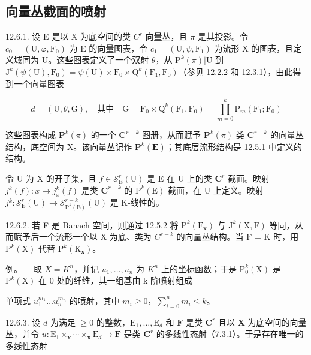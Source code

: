 \subsection{向量丛截面的喷射}

12.6.1. 设 E 是以 X 为底空间的类 \(C^{r}\) 向量丛，且 \(\pi\) 是其投影。令 \(c_{0} = (\mathrm{U}, \varphi, \mathrm{F}_{0})\) 为 E 的向量图表，令 \(c_{1} = (\mathrm{U}, \psi, \mathrm{F}_{1})\) 为流形 X 的图表，且定义域同为 U。这些图表定义了一个双射 \(\theta\)，从 \(\mathrm{P}^{k}(\pi)|\mathrm{U}\) 到 \(\mathrm{J}^{k}(\psi(\mathrm{U}), \mathrm{F}_{0}) = \psi(\mathrm{U}) \times \mathrm{F}_{0} \times \mathrm{Q}^{k}(\mathrm{F}_{1}, \mathrm{F}_{0})\)（参见 12.2.2 和 12.3.1），由此得到一个向量图表

\[
d = (\mathrm{U}, \theta, \mathrm{G}), \quad \text{其中}\quad \mathrm{G} = \mathrm{F}_{0}\times\mathrm{Q}^{k}(\mathrm{F}_{1},\mathrm{F}_{0}) = \prod_{m=0}^{k}\mathrm{P}_{m}(\mathrm{F}_{1};\mathrm{F}_{0})
\]

这些图表构成 \(\mathbf{P}^{k}(\pi)\) 的一个 \(\mathbf{C}^{r - k}\)-图册，从而赋予 \(\mathbf{P}^{k}(\pi)\) 类 \(\mathbf{C}^{r - k}\) 的向量丛结构，底空间为 X。该向量丛记作 \(\mathbf{P}^{k}(\mathbf{E})\)；其底层流形结构是 12.5.1 中定义的结构。

令 U 为 X 的开子集，且 \(f \in \mathcal{S}_{\mathrm{E}}^{r}(\mathrm{U})\) 是 E 在 U 上的类 \(\mathbf{C}^{r}\) 截面。映射 \(j^{k}(f): x \mapsto j_{x}^{k}(f)\) 是类 \(\mathbf{C}^{r - k}\) 的 \(\mathrm{P}^{k}(\mathrm{E})\) 截面，在 U 上定义。映射 \(j^{k}: \mathcal{S}_{\mathrm{E}}^{r}(\mathrm{U}) \to \mathcal{S}_{\mathrm{P}^{k}(\mathrm{E})}^{r - k}(\mathrm{U})\) 是 K-线性的。

12.6.2. 若 F 是 Banach 空间，则通过 12.5.2 将 \(\mathrm{P}^{k}(\mathrm{F}_{\mathbf{x}})\) 与 \(\mathrm{J}^{k}(\mathrm{X},\mathrm{F})\) 等同，从而赋予后一个流形一个以 X 为底、类为 \(C^{r-k}\) 的向量丛结构。当 F = K 时，用 \(\mathrm{P}^{k}(\mathrm{X})\) 代替 \(\mathrm{P}^{k}(\mathrm{K}_{\mathbf{x}})\)。

例。--- 取 \(X = K^{n}\)，并记 \(u_{1}, \ldots, u_{n}\) 为 \(K^{n}\) 上的坐标函数；于是 \(\mathrm{P}_{0}^{k}(\mathrm{X})\) 是 \(\mathrm{P}^{k}(\mathrm{X})\) 在 0 处的纤维，其一组基由 k 阶喷射组成

单项式 \(u_{1}^{m_1} \ldots u_{n}^{m_n}\) 的喷射，其中 \(m_i \geqslant 0\)，\(\sum_{i=0}^{n} m_i \leqslant k\)。

12.6.3. 设 \(d\) 为满足 \(\geqslant 0\) 的整数，\(\mathrm{E}_{1},\ldots,\mathrm{E}_{d}\) 和 \(\mathbf{F}\) 是类 \(\mathbf{C}^{r}\) 且以 \(\mathbf{X}\) 为底空间的向量丛，并令 \(u\colon\mathrm{E}_{1}\times_{\mathbf{x}}\cdots\times_{\mathbf{x}}\mathrm{E}_{d}\to\mathbf{F}\) 是类 \(\mathbf{C}^{r}\) 的多线性态射（7.3.1）。于是存在唯一的多线性态射

